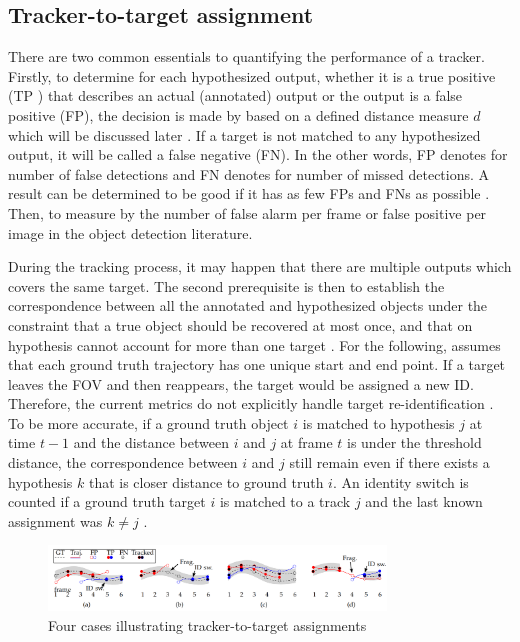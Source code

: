\subsection{Tracker-to-target assignment}
\hspace{0.45cm}There are two common essentials to quantifying the performance of a tracker. 
Firstly, to determine for each hypothesized output, whether it is a true positive (\acrshort{TP}
) that describes an actual (annotated) output or the output is a false positive (\acrshort{FP}),
 the decision is made by based on a defined distance measure $d$ which will be discussed later \cite{Milan2016MOT16AB}.
  If a target is not matched to any hypothesized output, it will be called a false negative (\acrshort{FN}). 
  In the other words, \acrshort{FP} denotes for number of false detections and \acrshort{FN} denotes for number of missed detections\cite{sort}. A result can be determined to be good if it has as few FPs and FNs as possible \cite{Milan2016MOT16AB}. 
  Then, to measure by the number of false alarm per frame or false positive per image in the object detection literature.\par
During the tracking process, it may happen that there are multiple outputs which covers the same target. 
The second prerequisite is then to establish the correspondence between all the annotated and hypothesized 
objects under the constraint that a true object should be recovered at most once, 
and that on hypothesis cannot account for more than one target \cite{Milan2016MOT16AB}. 
For the following, \cite{Milan2016MOT16AB} assumes that each ground truth trajectory has one unique start and end point. 
If a target leaves the \acrshort{FOV} and then reappears, the target would be assigned a new \acrshort{ID}. 
Therefore, the current metrics do not explicitly handle target re-identification \cite{Milan2016MOT16AB}. 
To be more accurate, if a ground truth object $i$ is matched to hypothesis $j$ at time $t-1$ and the distance between $i$ and $j$ at 
frame $t$ is under the threshold distance, the correspondence between $i$ and $j$ still 
remain even if there exists a hypothesis $k$ that is closer distance to ground truth $i$. 
An identity switch is counted if a ground truth target $i$ is matched to a track $j$ and the last known assignment was $k\neq j$ \cite{Milan2016MOT16AB}.\par
\begin{figure}[h!]
    \centering
    \includegraphics[width=0.8\textwidth]{Chapters/Fig/id_switch_mot.png}
    \caption{Four cases illustrating tracker-to-target assignments}
    \label{fig:ids_mot}
\end{figure}
